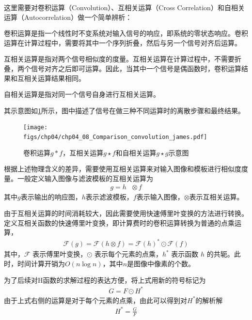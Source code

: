 这里需要对卷积运算（Convolution）、互相关运算（Cross Correlation）和自相关运算（Autocorrelation）做一个简单辨析：
\begin{compactenum}
	\item 卷积运算是指一个线性时不变系统对输入信号的响应，即系统的零状态响应。卷积运算在计算过程中，需要将其中一个序列折叠，然后与另一个信号对齐后运算。
	\item 互相关运算是指对两个信号相似度的度量。互相关运算在计算过程中，不需要折叠，两个信号对齐之后即可运算。因此，当其中一个信号是偶函数时，卷积运算结果和互相关运算结果相同。
	\item 自相关运算是指对同一个信号自身进行互相关运算。
\end{compactenum}

其示意图如\ref{fig:chp04_08_Comparison_convolution_james}\cite{wiki_cross_correlation}所示，图中描述了信号在做三种不同运算时的离散步骤和最终结果。
\begin{figure}[ht]   
	\centering
	\texttt{[image: figs/chp04/chp04\_08\_Comparison\_convolution\_james.pdf]}
	\caption{卷积运算$g*f$，互相关运算$g \star f$和自相关运算$g \star g$示意图}
	\label{fig:chp04_08_Comparison_convolution_james}
\end{figure}

根据上述物理含义的差异，需要使用互相关运算来对输入图像和模板进行相似度度量。一般定义输入图像与滤波模板的互相关运算为
\begin{align}
g=h\text{ }\otimes  f  
\end{align}
其中$g$表示输出的响应图，$h$表示滤波模板，$f$表示输入图像，$\otimes$表示互相关运算。

由于互相关运算的时间消耗较大，因此需要使用快速傅里叶变换的方法进行转换。定义互相关函数的快速傅里叶变换，即计算费时的卷积运算转换为普通的点乘运算，
\begin{align}
\mathcal{F}(g) = \mathcal{F}(h\otimes f)={{\mathcal{F}(h)}^{*}}\odot \mathcal{F}(f )
\end{align}
其中，$\mathcal{F}$ 表示傅里叶变换，$\odot$ 表示每个元素的点乘，$h^*$ 表示函数 $h$ 的共轭。此时，时间计算开销为$O(n\log n)$，其中$n$是图像中像素的个数。

为了后续对H函数的求解过程的表达方便，将上式用新的符号标记为
\begin{align}
G=F\odot H^*
\end{align}
由于上式右侧的运算是对于每个元素的点乘，由此可以得到对$H^*$的解析解
\begin{align}
H^* = \frac{G}{F}
\end{align}

